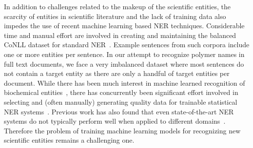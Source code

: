 
In addition to challenges related to the makeup of the scientific entities, the scarcity of entities in scientific literature and the lack of training data also impedes the use of recent machine learning based NER techniques.
Considerable time and manual effort are involved in creating and maintaining the balanced
CoNLL dataset for standard NER~\cite{tjong2003introduction}.
Example sentences from such corpora include one or more entities per sentence. 
In our attempt to recognize polymer names in full text documents, we face a very imbalanced dataset where most sentences do not contain a target entity as there are only a handful of target entities per document.
While there has been much interest in machine learned recognition of biochemical entities~\cite{jessop2011oscar4,rocktaschel2012chemspot,leaman2015tmchem,swain2016chemdataextractor}, there has concurrently been significant effort involved in selecting and (often manually) generating quality data for
trainable statistical NER systems~\cite{krallinger2015chemdner}. 
Previous work has also found that even state-of-the-art NER systems do
not typically perform well when applied to different domains~\cite{krallinger2013overview}. 
Therefore the problem of training machine learning models for recognizing new scientific entities remains a challenging one.

